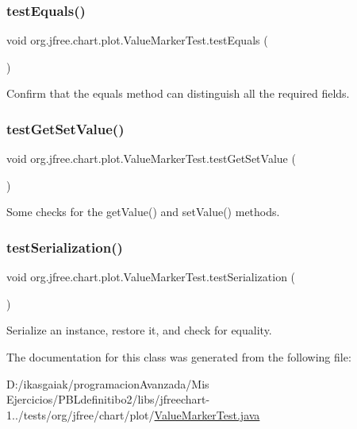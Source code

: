 \subsubsection{\texorpdfstring{test\+Equals()}{testEquals()}}
{\footnotesize\ttfamily void org.\+jfree.\+chart.\+plot.\+Value\+Marker\+Test.\+test\+Equals (\begin{DoxyParamCaption}{ }\end{DoxyParamCaption})}

Confirm that the equals method can distinguish all the required fields. \mbox{\label{classorg_1_1jfree_1_1chart_1_1plot_1_1_value_marker_test_a94266b341cfcf362cfc602fcfb40f7c3}} 
\subsubsection{\texorpdfstring{test\+Get\+Set\+Value()}{testGetSetValue()}}
{\footnotesize\ttfamily void org.\+jfree.\+chart.\+plot.\+Value\+Marker\+Test.\+test\+Get\+Set\+Value (\begin{DoxyParamCaption}{ }\end{DoxyParamCaption})}

Some checks for the get\+Value() and set\+Value() methods. \mbox{\label{classorg_1_1jfree_1_1chart_1_1plot_1_1_value_marker_test_a81dd054c6a69d896c32540425e3f8136}} 
\subsubsection{\texorpdfstring{test\+Serialization()}{testSerialization()}}
{\footnotesize\ttfamily void org.\+jfree.\+chart.\+plot.\+Value\+Marker\+Test.\+test\+Serialization (\begin{DoxyParamCaption}{ }\end{DoxyParamCaption})}

Serialize an instance, restore it, and check for equality. 

The documentation for this class was generated from the following file\+:\begin{DoxyCompactItemize}
\item 
D\+:/ikasgaiak/programacion\+Avanzada/\+Mis Ejercicios/\+P\+B\+Ldefinitibo2/libs/jfreechart-\/1../tests/org/jfree/chart/plot/\mbox{\hyperlink{_value_marker_test_8java}{Value\+Marker\+Test.\+java}}\end{DoxyCompactItemize}
